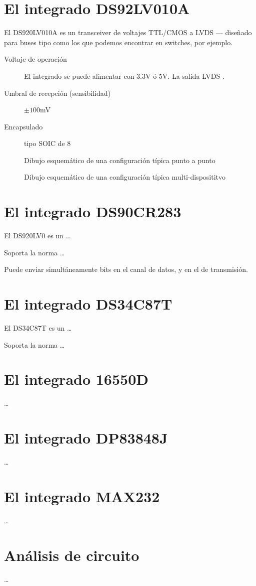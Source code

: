 \documentclass[a4paper]{article}
\begin{document}
%
\sffamily
%
\maketitle
%
% 
\section{El integrado DS92LV010A}
%
El DS920LV010A es un transceiver de voltajes TTL/CMOS a LVDS --- 
diseñado para buses tipo  como los que podemos encontrar en switches, por ejemplo.
%
\begin{description}
\item[Voltaje de operación] El integrado se puede alimentar con 3.3V ó 5V. La salida LVDS .
\item[Umbral de recepción (sensibilidad)] $\pm 100$mV
\item[Encapsulado] tipo SOIC de 8 
\end{description}
%
\begin{figure}[h]
\caption{Dibujo esquemático de una configuración típica punto a punto}
\end{figure}
%
\begin{figure}[h]
\caption{Dibujo esquemático de una configuración típica multi-disposititvo}
\end{figure}
%
\section{El integrado DS90CR283}
%
El DS920LV0 es un \ldots

Soporta la norma \ldots

Puede enviar simultáneamente  bits en el canal de datos, y  en el de transmisión.
%
\section{El integrado DS34C87T}
%
El DS34C87T es un \ldots

Soporta la norma \ldots
%
\section{El integrado 16550D}
%
\ldots
%
\section{El integrado DP83848J}
%
\ldots
%
\section{El integrado MAX232}
%
\ldots
%
\section{Análisis de circuito}
%
\ldots
%
\end{document}
